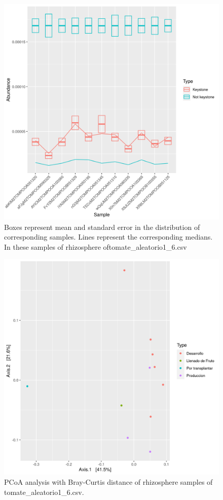 \begin{figure}
 \centering
 \includegraphics[scale = 0.75]{mean_median_key_vs_not_key_tomate_aleatorio1_6.csv.png}
\caption{Boxes represent mean and standard error in the distribution of corresponding samples. Lines represent the corresponding medians. In these samples of rhizosphere oftomate_aleatorio1_6.csv}
\label{mean_median_tomate_aleatorio1_6.csv}
\end{figure}
\begin{figure}
   \centering
   \includegraphics[scale = 0.7]{pcoa_muestras_tomate_aleatorio1_6.csv.png}
 \caption{PCoA analysis with Bray-Curtis distance of rhizosphere samples of tomate_aleatorio1_6.csv.}
 \label{fig:tomate_aleatorio1_6.csv_pcoa}
\end{figure}
